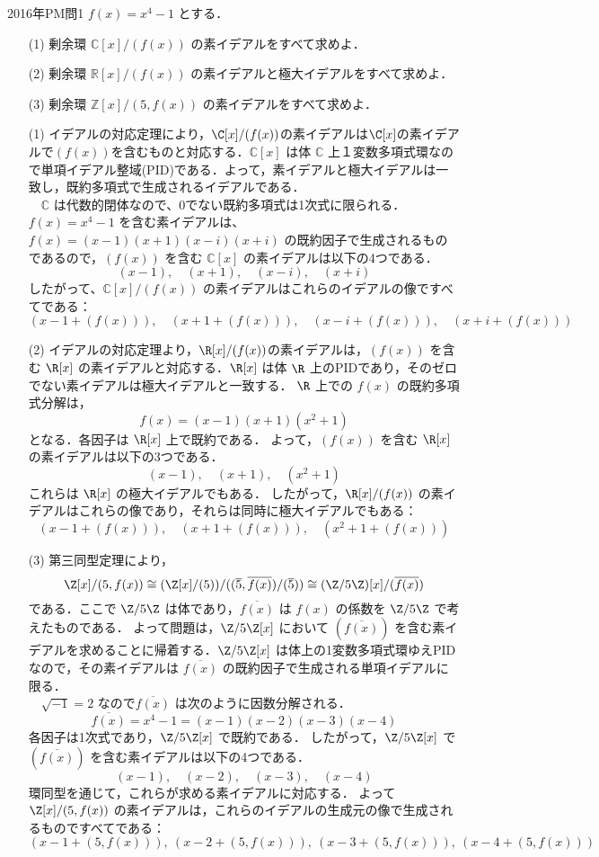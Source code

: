\documentclass[a4paper,11pt]{ltjsarticle}
\title{}
\author{}
\date{}
\begin{document}
\begin{ascolorbox17}{2016年PM問1}
$f(x) = x^4-1$ とする．
\begin{itemize}
    \item[(1)] 剰余環 $\mathbb{C}[x]/(f(x))$ の素イデアルをすべて求めよ．
    \item[(2)] 剰余環 $\mathbb{R}[x]/(f(x))$ の素イデアルと極大イデアルをすべて求めよ．
    \item[(3)] 剰余環 $\mathbb{Z}[x]/(5, f(x))$ の素イデアルをすべて求めよ．
\end{itemize}
\end{ascolorbox17}
\ans
\begin{itemize}
    \item [(1)]イデアルの対応定理により，$\C[x]/(f(x))$の素イデアルは$\C[x]$の素イデアルで$(f(x))$を含むものと対応する．$\mathbb{C}[x]$ は体 $\mathbb{C}$ 上１変数多項式環なので単項イデアル整域(PID)である．よって，素イデアルと極大イデアルは一致し，既約多項式で生成されるイデアルである．\\
　$\mathbb{C}$ は代数的閉体なので、0でない既約多項式は1次式に限られる．$f(x) = x^4-1$ を含む素イデアルは、$f(x) = (x-1)(x+1)(x-i)(x+i)$ の既約因子で生成されるものであるので，$(f(x))$ を含む $\mathbb{C}[x]$ の素イデアルは以下の4つである．
\[ (x-1), \quad (x+1), \quad (x-i), \quad (x+i) \]
したがって、$\mathbb{C}[x]/(f(x))$ の素イデアルはこれらのイデアルの像ですべてである：
\[ (x-1 + (f(x))), \quad (x+1 + (f(x))), \quad (x-i + (f(x))), \quad (x+i + (f(x))) \]

\item[(2)]
イデアルの対応定理より，$\R[x]/(f(x))$の素イデアルは，$(f(x))$ を含む $\R[x]$ の素イデアルと対応する．$\R[x]$ は体 $\R$ 上のPIDであり，そのゼロでない素イデアルは極大イデアルと一致する．
$\R$ 上での $f(x)$ の既約多項式分解は，
\[ f(x) = (x-1)(x+1)(x^2+1) \]
となる．各因子は $\R[x]$ 上で既約である．
よって，$(f(x))$ を含む $\R[x]$ の素イデアルは以下の3つである．
\[ (x-1), \quad (x+1), \quad (x^2+1) \]
これらは $\R[x]$ の極大イデアルでもある．
したがって，$\R[x]/(f(x))$ の素イデアルはこれらの像であり，それらは同時に極大イデアルでもある：
\[ (x-1 + (f(x))), \quad (x+1 + (f(x))), \quad (x^2+1 + (f(x))) \]
\item[(3)]第三同型定理により，
\[\Z[x]/(5, f(x)) \cong(\Z[x]/(5))/((\overline{5}, \overline{f(x)})/(\overline{5})) \cong(\Z/5\Z)[x]/(\overline{f(x)})\]
である．ここで $\Z/5\Z $ は体であり，$\overline{f(x)}$ は $f(x)$ の係数を $\Z/5\Z$ で考えたものである．
よって問題は，$\Z/5\Z[x]$ において $(\overline{f(x)})$ を含む素イデアルを求めることに帰着する．$\Z/5\Z[x]$ は体上の1変数多項式環ゆえPIDなので，その素イデアルは $\overline{f(x)}$ の既約因子で生成される単項イデアルに限る．\\
　$\sqrt{-1}=2$ なので$\overline{f(x)}$ は次のように因数分解される．
\[ \overline{f(x)} = x^4-1 = (x-1)(x-2)(x-3)(x-4) \]
各因子は1次式であり，$\Z/5\Z[x]$ で既約である．
したがって，$\Z/5\Z[x]$ で $(\overline{f(x)})$ を含む素イデアルは以下の4つである．
\[ (x-1), \quad (x-2), \quad (x-3), \quad (x-4) \]
環同型を通じて，これらが求める素イデアルに対応する．
よって $\Z[x]/(5, f(x))$ の素イデアルは，これらのイデアルの生成元の像で生成されるものですべてである：
\[ (x-1 + (5, f(x))), \ (x-2 + (5, f(x))), \ (x-3 + (5, f(x))), \ (x-4 + (5, f(x))) \]

\end{itemize}
\end{document}
